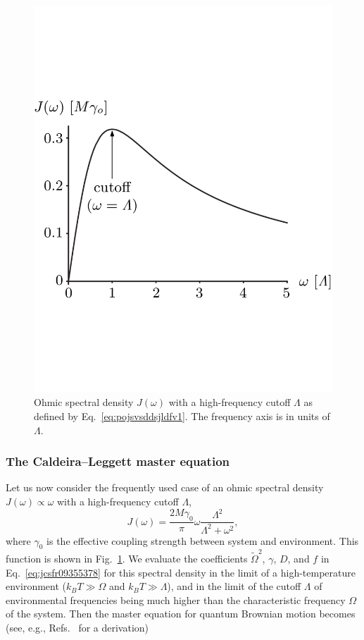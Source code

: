 \documentclass[3p,sort&compress,12pt]{elsarticle}
\begin{document}
\begin{figure}
\centering
\includegraphics[scale=0.27]{spectraldens2.pdf}
\caption{Ohmic spectral density $J(\omega)$ with a high-frequency cutoff $\Lambda$ as defined by Eq.~\eqref{eq:pojsvsddsjldfv1}. The frequency axis is in units of $\Lambda$.}
\label{fig:spectraldensity}
\end{figure}

\subsubsection{\label{sec:cald-legg-mast}The Caldeira--Leggett master equation}

Let us now consider the frequently used case of an ohmic spectral density $J(\omega) \propto \omega$ with a high-frequency cutoff $\Lambda$,
%
\begin{equation}
  \label{eq:pojsvsddsjldfv1}
  J(\omega) = \frac{2M\gamma_0}{\pi} \omega
  \frac{\Lambda^2}{\Lambda^2 + \omega^2},
\end{equation}
%
where $\gamma_0$ is the effective coupling strength between  system and  environment. This function is shown in Fig.~\ref{fig:spectraldensity}. We evaluate the coefficients $\widetilde{\Omega}^2$, $\gamma$, $D$, and $f$ in Eq.~\eqref{eq:jcsfr09355378} for this spectral density in the limit of a high-temperature environment ($k_B T \gg \Omega$ and $k_B T \gg \Lambda$), and in the limit of the cutoff $\Lambda$ of environmental frequencies being much higher than the characteristic frequency $\Omega$ of the system. Then the master equation for quantum Brownian motion becomes (see, e.g., Refs.~\cite{Breuer:2002:oq,Schlosshauer:2007:un} for a derivation)
\end{document}
